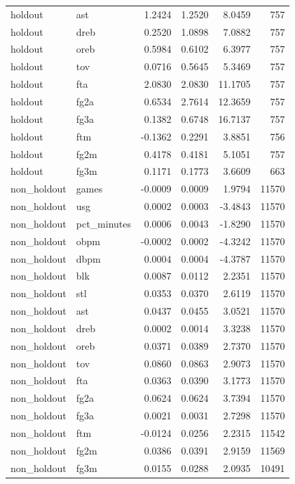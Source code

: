 \begin{table}
\begin{tabular}{llrrrr}
holdout & ast & 1.2424 & 1.2520 & 8.0459 & 757 \\
holdout & dreb & 0.2520 & 1.0898 & 7.0882 & 757 \\
holdout & oreb & 0.5984 & 0.6102 & 6.3977 & 757 \\
holdout & tov & 0.0716 & 0.5645 & 5.3469 & 757 \\
holdout & fta & 2.0830 & 2.0830 & 11.1705 & 757 \\
holdout & fg2a & 0.6534 & 2.7614 & 12.3659 & 757 \\
holdout & fg3a & 0.1382 & 0.6748 & 16.7137 & 757 \\
holdout & ftm & -0.1362 & 0.2291 & 3.8851 & 756 \\
holdout & fg2m & 0.4178 & 0.4181 & 5.1051 & 757 \\
holdout & fg3m & 0.1171 & 0.1773 & 3.6609 & 663 \\
non\_holdout & games & -0.0009 & 0.0009 & 1.9794 & 11570 \\
non\_holdout & usg & 0.0002 & 0.0003 & -3.4843 & 11570 \\
non\_holdout & pct\_minutes & 0.0006 & 0.0043 & -1.8290 & 11570 \\
non\_holdout & obpm & -0.0002 & 0.0002 & -4.3242 & 11570 \\
non\_holdout & dbpm & 0.0004 & 0.0004 & -4.3787 & 11570 \\
non\_holdout & blk & 0.0087 & 0.0112 & 2.2351 & 11570 \\
non\_holdout & stl & 0.0353 & 0.0370 & 2.6119 & 11570 \\
non\_holdout & ast & 0.0437 & 0.0455 & 3.0521 & 11570 \\
non\_holdout & dreb & 0.0002 & 0.0014 & 3.3238 & 11570 \\
non\_holdout & oreb & 0.0371 & 0.0389 & 2.7370 & 11570 \\
non\_holdout & tov & 0.0860 & 0.0863 & 2.9073 & 11570 \\
non\_holdout & fta & 0.0363 & 0.0390 & 3.1773 & 11570 \\
non\_holdout & fg2a & 0.0624 & 0.0624 & 3.7394 & 11570 \\
non\_holdout & fg3a & 0.0021 & 0.0031 & 2.7298 & 11570 \\
non\_holdout & ftm & -0.0124 & 0.0256 & 2.2315 & 11542 \\
non\_holdout & fg2m & 0.0386 & 0.0391 & 2.9159 & 11569 \\
non\_holdout & fg3m & 0.0155 & 0.0288 & 2.0935 & 10491 \\
\bottomrule
\end{tabular}
\end{table}
